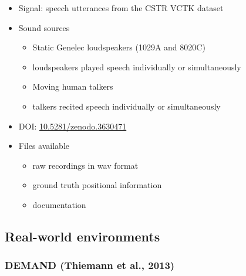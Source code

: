\documentclass[14pt, oneside]{extarticle}
\begin{document}
\begin{itemize}
\item Signal: speech utterances from the CSTR VCTK dataset

\item Sound sources
	\begin{itemize}
	\item Static Genelec loudspeakers (1029A and 8020C)
	\item loudspeakers played speech individually or simultaneously
	\item Moving human talkers
	\item talkers recited speech individually or simultaneously
	\end{itemize}

\item DOI: \href{https://zenodo.org/record/3630471}{10.5281/zenodo.3630471} 

\item Files available
	\begin{itemize}
	\item raw recordings in wav format
	\item ground truth positional information
	\item documentation
	\end{itemize}

\end{itemize}

\subsection{Real-world environments}

\subsubsection{DEMAND (Thiemann et al., 2013)}
\end{document}
